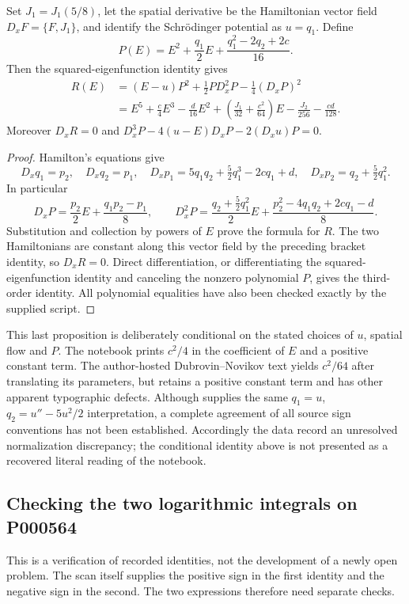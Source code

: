 \begin{proposition}\leavevmode\par\noindent\oursComputed\quad
Set \(J_1=J_1(5/8)\), let the spatial derivative be the Hamiltonian vector field \(D_xF=\{F,J_1\}\), and identify the Schrödinger potential as \(u=q_1\). Define
\[
 P(E)=E^2+\frac{q_1}2E+\frac{q_1^2-2q_2+2c}{16}.
\]
Then the squared-eigenfunction identity gives
\begin{align*}
 R(E)&=(E-u)P^2+\frac12P D_x^2P-\frac14(D_xP)^2\\
 &=E^5+\frac c4E^3-\frac d{16}E^2
   +\left(\frac{J_1}{32}+\frac{c^2}{64}\right)E
   -\frac{J_2}{256}-\frac{cd}{128}.
\end{align*}
Moreover \(D_xR=0\) and
\(D_x^3P-4(u-E)D_xP-2(D_xu)P=0\).
\end{proposition}
\begin{proof}
Hamilton's equations give
\[
 D_xq_1=p_2,\quad D_xq_2=p_1,\quad
 D_xp_1=5q_1q_2+\tfrac52q_1^3-2cq_1+d,\quad
 D_xp_2=q_2+\tfrac52q_1^2.
\]
In particular
\[
 D_xP=\frac{p_2}2E+\frac{q_1p_2-p_1}{8},\qquad
 D_x^2P=\frac{q_2+\frac52q_1^2}{2}E
          +\frac{p_2^2-4q_1q_2+2cq_1-d}{8}.
\]
Substitution and collection by powers of \(E\) prove the formula for \(R\). The two Hamiltonians are constant along this vector field by the preceding bracket identity, so \(D_xR=0\). Direct differentiation, or differentiating the squared-eigenfunction identity and canceling the nonzero polynomial \(P\), gives the third-order identity. All polynomial equalities have also been checked exactly by the supplied script.
\end{proof}

This last proposition is deliberately conditional on the stated choices of \(u\), spatial flow and \(P\). The notebook prints \(c^2/4\) in the coefficient of \(E\) and a positive constant term. The author-hosted Dubrovin--Novikov text yields \(c^2/64\) after translating its parameters, but retains a positive constant term and has other apparent typographic defects. Although \citet[Ch.~II, \S4, p.~105]{dubrovinmatveevnovikov1976nonlinear} supplies the same \(q_1=u\), \(q_2=u''-5u^2/2\) interpretation, a complete agreement of all source sign conventions has not been established. Accordingly the data record an unresolved normalization discrepancy; the conditional identity above is not presented as a recovered literal reading of the notebook.


\subsection{Checking the two logarithmic integrals on P000564}
This is a verification of recorded identities, not the development of a newly open problem. The scan itself supplies the positive sign in the first identity and the negative sign in the second. The two expressions therefore need separate checks.

